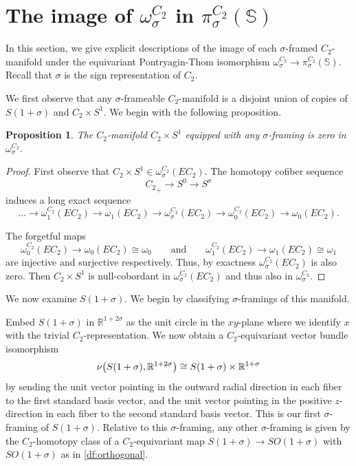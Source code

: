 \documentclass[11pt]{amsart}
\newcommand{\R}{\mathbb R}
\newcommand{\Sph}{\mathbb{S}}
\theoremstyle{plain}   %
\newtheorem{prop}[thm]{Proposition}
\theoremstyle{definition}
\theoremstyle{remark}
\numberwithin{equation}{section}
\let\originalleft\left
\let\originalright\right
\renewcommand{\left}{\mathopen{}\mathclose\bgroup\originalleft}
\renewcommand{\right}{\aftergroup\egroup\originalright}
\begin{document}
\section{The image of \texorpdfstring{$\omega_\sigma^{C_2}$}{TEXT} in \texorpdfstring{$\pi_\sigma^{C_2}(\Sph)$}{TEXT}}
In this section, we give explicit descriptions of the image of each $\sigma$-framed $C_2$-manifold under the equivariant Pontryagin-Thom isomorphism $\omega_\sigma^{C_2}\to \pi_\sigma^{C_2}(\Sph)$. Recall that $\sigma$ is the sign representation of $C_2$. 

We first observe that any $\sigma$-frameable $C_2$-manifold is a disjoint union of copies of $S(1+\sigma)$ and $C_2\times S^1$. We begin with the following proposition.

\begin{prop}
The $C_2$-manifold $C_2\times S^1$ equipped with any $\sigma$-framing is zero in $\omega_\sigma^{C_2}$. 
\end{prop}

\begin{proof}
First observe that $C_2\times S^1\in \omega_\sigma^{C_2}(EC_2)$. The homotopy cofiber sequence
\[
{C_2}_+\to S^0\to S^\sigma
\]
induces a long exact sequence
\[
\dots\to\omega_1^{C_2}(EC_2)\to \omega_1(EC_2)\to \omega_\sigma^{C_2}(EC_2) \to \omega_0^{C_2} (EC_2)\to \omega_0(EC_2). 
\]

The forgetful maps 
\[
\omega_0^{C_2}(EC_2)\to\omega_0(EC_2)\cong \omega_0 \qquad \text{and}\qquad \omega_1^{C_2}(EC_2)\to \omega_1(EC_2)\cong\omega_1
\]
are injective and surjective respectively. Thus, by exactness $\omega_\sigma^{C_2}(EC_2)$ is also zero. Then $C_2\times S^1$ is null-cobordant in $\omega_\sigma^{C_2}(EC_2)$ and thus also in $\omega_\sigma^{C_2}$. 
\end{proof}

We now examine $S(1+\sigma)$. We begin by classifying $\sigma$-framings of this manifold.

Embed $S(1+\sigma)$ in $\R^{1+2\sigma}$ as the unit circle in the $xy$-plane where we identify $x$ with the trivial $C_2$-representation. We now obtain a $C_2$-equivariant vector bundle isomorphism
\[
\nu\left(S(1+\sigma),\R^{1+2\sigma}\right)\cong S(1+\sigma)\times \R^{1+\sigma}
\]
by sending the unit vector pointing in the outward radial direction in each fiber to the first standard basis vector, and the unit vector pointing in the positive $z$-direction in each fiber to the second standard basis vector. This is our first $\sigma$-framing of $S(1+\sigma)$. Relative to this $\sigma$-framing, any other $\sigma$-framing is given by the $C_2$-homotopy class of a  $C_2$-equivariant map $S(1+\sigma)\to SO(1+\sigma)$ with $SO(1+\sigma)$ as in \cref{df:orthogonal}.
\end{document}
